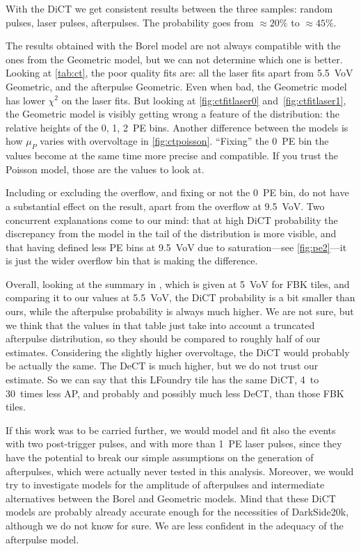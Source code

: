 With the DiCT we get consistent results between the three samples: random
pulses, laser pulses, afterpulses. The probability goes from $\approx\SI{20}\%$
to $\approx\SI{45}\%$.

The results obtained with the Borel model are not always compatible with the
ones from the Geometric model, but we can not determine which one is better.
Looking at \autoref{tab:ct}, the poor quality fits are: all the laser fits
apart from \SI{5.5}{VoV} Geometric, and the afterpulse Geometric. Even when
bad, the Geometric model has lower $\chi^2$ on the laser fits. But looking at
\autoref{fig:ctfitlaser0} and~\ref{fig:ctfitlaser1}, the Geometric model is
visibly getting wrong a feature of the distribution: the relative heights of
the 0, 1, 2~PE bins. Another difference between the models is how $\mu_P$
varies with overvoltage in \autoref{fig:ctpoisson}. ``Fixing'' the 0~PE bin the
values become at the same time more precise and compatible. If you trust the
Poisson model, those are the values to look at.

Including or excluding the overflow, and fixing or not the 0~PE bin, do not
have a substantial effect on the result, apart from the overflow at
\SI{9.5}{VoV}. Two concurrent explanations come to our mind: that at high DiCT
probability the discrepancy from the model in the tail of the distribution is
more visible, and that having defined less PE bins at \SI{9.5}{VoV} due to
saturation---see \autoref{fig:pe2}---it is just the wider overflow bin that is
making the difference.

Overall, looking at the summary in \cite[tab.~3.1~p.~62]{savarese2018}, which
is given at \SI{5}{VoV} for FBK tiles, and comparing it to our values at
\SI{5.5}{VoV}, the DiCT probability is a bit smaller than ours, while the
afterpulse probability is always much higher. We are not sure, but we think
that the values in that table just take into account a truncated afterpulse
distribution, so they should be compared to roughly half of our estimates.
Considering the slightly higher overvoltage, the DiCT would probably be
actually the same. The DeCT is much higher, but we do not trust our estimate.
So we can say that this LFoundry tile has the same DiCT, 4~to 30~times less AP,
and probably and possibly much less DeCT, than those FBK tiles.

If this work was to be carried further, we would model and fit also the events
with two post-trigger pulses, and with more than 1~PE laser pulses, since they
have the potential to break our simple assumptions on the generation of
afterpulses, which were actually never tested in this analysis. Moreover, we
would try to investigate models for the amplitude of afterpulses and
intermediate alternatives between the Borel and Geometric models. Mind that
these DiCT models are probably already accurate enough for the necessities of
DarkSide20k, although we do not know for sure. We are less confident in the
adequacy of the afterpulse model.

